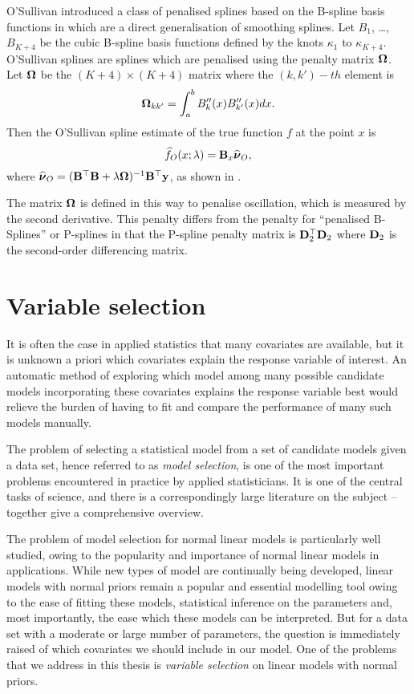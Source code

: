 O'Sullivan introduced a class of penalised splines based on the B-spline basis
functions in \cite{OSullivan1986} which are a direct generalisation of
smoothing splines. Let $B_1$, \ldots, $B_{K+4}$ be the cubic B-spline basis
functions defined by the knots $\kappa_1$ to $\kappa_{K+4}$. O'Sullivan splines
are splines which are penalised using the penalty matrix ${\boldsymbol \Omega}$. Let
${\boldsymbol \Omega}$ be the $(K+4) \times (K+4)$ matrix where the $(k, k')-th$ element is
\[ {\boldsymbol \Omega}_{k k'} = \int_a^b B''_k(x) B''_{k'}(x) dx. \] Then the O'Sullivan
spline estimate of the true function $f$ at the point $x$ is
\begin{equation*}
\widehat{f}_O(x; \lambda) = {\bf B}_x \widehat{{\boldsymbol \nu}}_O,
\end{equation*}
where $\widehat{{\boldsymbol \nu}}_O = ({\bf B}^\top {\bf B} + \lambda {\boldsymbol\Omega})^{-1} {\bf B}^\top {\bf y}$,
as shown in \cite{ruppert_wand_carroll_2003}.

The matrix ${\boldsymbol \Omega}$ is defined in this way to penalise oscillation, which is
measured by the second derivative. This penalty differs from the penalty for
``penalised B-Splines'' or P-splines in that the P-spline penalty matrix is
${\bf D}_2^\top {\bf D}_2$ where ${\bf D}_2$ is the second-order differencing matrix.

\section{Variable selection}

It is often the case in applied statistics that many covariates are available,
but it is unknown a priori which covariates explain the response variable of
interest. An automatic method of exploring which model among many possible
candidate models incorporating these covariates explains the response variable
best would relieve the burden of having to fit and compare the performance of
many such models manually.

The problem of selecting a statistical model from a set of candidate models
given a data set, hence referred to as \emph{model selection}, is one of the
most important problems encountered in practice by applied statisticians. It is
one of the central tasks of science, and there is a correspondingly large
literature on the subject -- \cite{Claeskens:1251912, NengjunYi2013,
Johnstone2009} together give a comprehensive overview.

The problem of model selection for normal linear models is particularly well
studied, owing to the popularity and importance of normal linear models in
applications. While new types of model are continually being developed, linear
models with normal priors remain a popular and essential modelling tool owing to
the ease of fitting these models, statistical inference on the parameters and,
most importantly, the ease which these models can be interpreted. But for a data
set with a moderate or large number of parameters, the question is immediately
raised of which covariates we should include in our model. One of the problems
that we address in this thesis is \emph{variable selection} on linear models
with normal priors.

